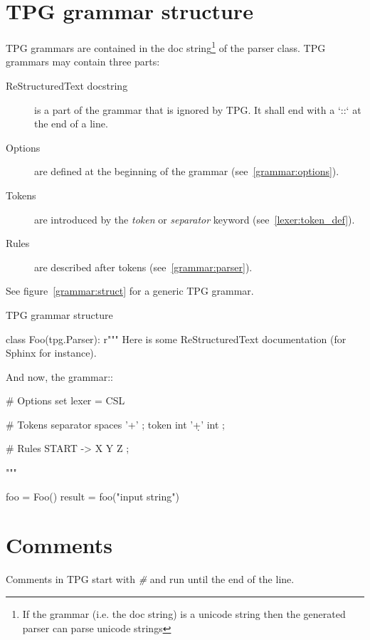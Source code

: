 \section{TPG grammar structure}

TPG grammars are contained in the doc string\footnote{If the grammar (i.e. the doc string) is a unicode string then the generated parser can parse unicode strings} of the parser class.
TPG grammars may contain three parts:

\begin{description}
    \item [ReStructuredText docstring]
        is a part of the grammar that is ignored by TPG. It shall end with a `::` at the end of a line.
    \item [Options]
        are defined at the beginning of the grammar (see~\ref{grammar:options}).
    \item [Tokens]
        are introduced by the \emph{token} or \emph{separator} keyword (see~\ref{lexer:token_def}).
    \item [Rules]
        are described after tokens (see~\ref{grammar:parser}).
\end{description}

See figure~\ref{grammar:struct} for a generic TPG grammar.

\begin{code}
\caption{TPG grammar structure}                             \label{grammar:struct}
\begin{verbatimtab}[4]
class Foo(tpg.Parser):
    r"""
    Here is some ReStructuredText documentation
    (for Sphinx for instance).

    And now, the grammar::

        # Options
        set lexer = CSL

        # Tokens
        separator spaces    '\s+'       ;
        token int           '\d+'   int ;

        # Rules
        START -> X Y Z ;

    """

foo = Foo()
result = foo("input string")
\end{verbatimtab}
\end{code}

\section{Comments}

Comments in TPG start with \emph{\#} and run until the end of the line.

